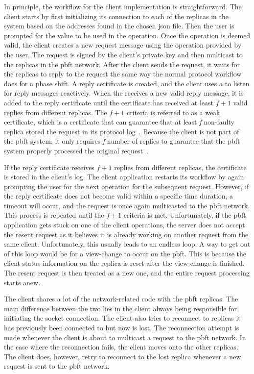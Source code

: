 In principle, the workflow for the client implementation is straightforward. The client starts by first initializing its connection to each of the replicas in the system based on the addresses found in the chosen \ac{json} file. Then the user is prompted for the value to be used in the operation. Once the operation is deemed valid, the client creates a new request message using the operation provided by the user. The request is signed by the client’s private key and then multicast to the replicas in the \ac{pbft} network. After the client sends the request, it waits for the replicas to reply to the request the same way the normal protocol workflow does for a phase shift. A reply certificate is created, and the client uses a  to listen for reply messages reactively. When the  receives a new valid reply message, it is added to the reply certificate until the certificate has received at least $f+1$ valid replies from different replicas. The $f+1$ criteria is referred to as a weak certificate, which is a certificate that can guarantee that at least \emph{f} non-faulty replica stored the request in its protocol log~\cites[p.~9]{PAPER:PBFTRecovery}[p.~2]{PAPER:DPBFT}. Because the client is not part of the \ac{pbft} system, it only requires \emph{f} number of replies to guarantee that the \ac{pbft} system properly processed the original request~\cites[p.~3]{PAPER:OGPBFT}[p.~9]{PAPER:PBFTRecovery}.

If the reply certificate receives $f+1$ replies from different replicas, the certificate is stored in the client’s log. The client application restarts its workflow by again prompting the user for the next operation for the subsequent request. However, if the reply certificate does not become valid within a specific time duration, a timeout will occur, and the request is once again multicasted to the \ac{pbft} network. This process is repeated until the $f+1$ criteria is met. Unfortunately, if the \ac{pbft} application gets stuck on one of the client operations, the server does not accept the resent request as it believes it is already working on another request from the same client.  Unfortunately, this usually leads to an endless loop. A way to get out of this loop would be for a view-change to occur on the \ac{pbft}. This is because the client status information on the replica is reset after the view-change is finished. The resent request is then treated as a new one, and the entire request processing starts anew.

The client shares a lot of the network-related code with the \ac{pbft} replicas. The main difference between the two lies in the client always being responsible for initiating the socket connection. The client also tries to reconnect to replicas it has previously been connected to but now is lost. The reconnection attempt is made whenever the client is about to multicast a request to the \ac{pbft} network. In the case where the reconnection fails, the client moves onto the other replicas. The client does, however, retry to reconnect to the lost replica whenever a new
request is sent to the \ac{pbft} network. 

